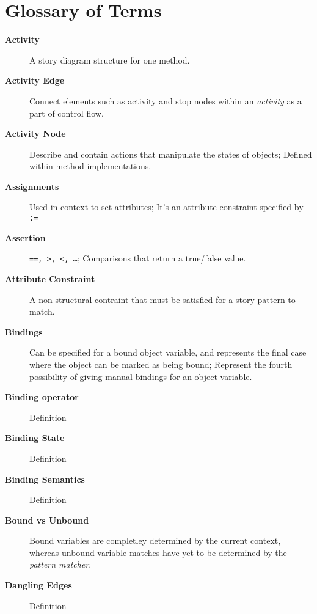 \newpage
\section{Glossary of Terms}
\vspace{0.5cm}

\begin{description}

\item[\bf Activity]
A story diagram structure for one method.

\item[\bf Activity Edge]
Connect elements such as activity and stop nodes within an \emph{activity} as a part of control flow.

\item[\bf Activity Node]
Describe and contain actions that manipulate the states of objects; Defined within method implementations.

\item[\bf Assignments]
Used in context to set attributes; It's an attribute constraint specified by \texttt{:=}

\item[\bf Assertion]
\texttt{==, >, <, \ldots}; Comparisons that return a true/false value.

\item[\bf Attribute Constraint]
A non-structural contraint that must be satisfied for a story pattern to match.

\item[\bf Bindings]
Can be specified for a bound object variable, and represents the final case where the object can be marked as being bound; Represent the fourth 
possibility of giving manual bindings for an object variable.

\item[\bf Binding operator]
Definition

\item[\bf Binding State]
Definition 

\item[\bf Binding Semantics]
Definition

\item[\bf Bound vs Unbound]
Bound variables are completley determined by the current context, whereas unbound variable matches have yet to be determined by the \emph{pattern matcher}.

\item[\bf Dangling Edges]
Definition


\end{description}
